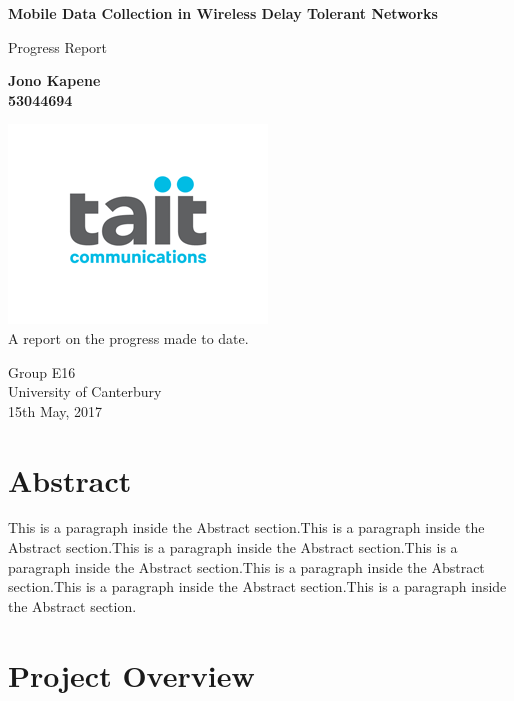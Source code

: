 \documentclass[a4paper,12pt]{article}
\begin{document}
	\begin{titlepage}
    		\begin{center}
        		\vspace*{1cm}
        
        		\textbf{Mobile Data Collection in Wireless Delay Tolerant Networks}
        
        		\vspace{0.5cm}
        		Progress Report
        
        		\vspace{1.5cm}
        
        		\textbf{Jono Kapene \\ 53044694}
        
        		\vfill
        		\includegraphics[scale=0.8]{Tait-Communications-logo.png}\\
        		A report on the progress made to date.
        		
        		\vspace{0.8cm}
        
        		Group E16\\
        		University of Canterbury\\
        		15th May, 2017
        
    \end{center}
\end{titlepage}
	\clearpage
	\tableofcontents
	\clearpage
	
	
\section{Abstract}
This is a paragraph inside the Abstract section.This is a paragraph inside the Abstract section.This is a paragraph inside the Abstract section.This is a paragraph inside the Abstract section.This is a paragraph inside the Abstract section.This is a paragraph inside the Abstract section.This is a paragraph inside the Abstract section.

\section{Project Overview}
\end{document}
